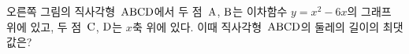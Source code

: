 \noindent\begin{minipage}[t]{0.58\linewidth}\vspace{0pt}\raggedright 오른쪽 그림의 직사각형~$\mathrm{ABCD}$에서 두 점~$\mathrm{A}$, $\mathrm{B}$는 이차함수 $y=x^2-6x$의 그래프 위에 있고, 두 점~$\mathrm{C}$, $\mathrm{D}$는 $x$축 위에 있다. 이때 직사각형~$\mathrm{ABCD}$의 둘레의 길이의 최댓값은? \end{minipage}\hfill\begin{minipage}[t]{0.4\linewidth}\vspace{0pt}\centering \resizebox{\ifdim\width>\linewidth\linewidth\else\width\fi}{!}{}\end{minipage}\par
{}
